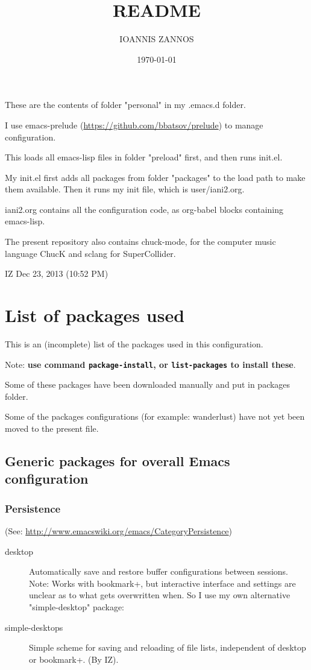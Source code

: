 \documentclass{article}
\author{IOANNIS ZANNOS}
\date{\today}
\title{README}
\begin{document}
\maketitle
\tableofcontents

These are the contents of folder "personal" in my .emacs.d folder.

I use emacs-prelude (\url{https://github.com/bbatsov/prelude}) to manage configuration.

This loads all emacs-lisp files in folder "preload" first, and then runs init.el.

My init.el first adds all packages from folder "packages" to the load path to make them available.  Then it runs my init file, which is user/iani2.org.

iani2.org contains all the configuration code, as org-babel blocks containing emacs-lisp.

The present repository also contains chuck-mode, for the computer music language ChucK and sclang for SuperCollider.

IZ Dec 23, 2013 (10:52 PM)

\section{List of packages used}
\label{sec-1}

This is an (incomplete) list of the packages used in this configuration.

Note: \textbf{use command \texttt{package-install}, or \texttt{list-packages} to install these}.

Some of these packages have been downloaded manually and put in packages folder.

Some of the packages configurations (for example: wanderlust) have not yet been moved to the present file.

\subsection{Generic packages for overall Emacs configuration}
\label{sec-1-1}

\subsubsection{Persistence}
\label{sec-1-1-1}

(See: \url{http://www.emacswiki.org/emacs/CategoryPersistence})

\begin{description}
\item[{desktop}] Automatically save and restore buffer configurations between sessions.
Note: Works with bookmark+, but interactive interface and settings are unclear as to what gets overwritten when.  So I use my own alternative "simple-desktop" package:
\item[{simple-desktops}] Simple scheme for saving and reloading of file lists, independent of desktop or bookmark+. (By IZ).
\end{description}
\end{document}
